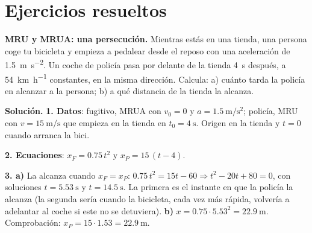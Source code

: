 
\section{Ejercicios resueltos}\label{sec:ud9-resueltos}

\begin{example}
    \textbf{MRU y MRUA: una persecución.} Mientras estás en una tienda, una persona coge tu bicicleta y empieza a pedalear desde el
    reposo con una aceleración de \qty{1.5}{\m\per\s\squared}. Un coche de policía pasa por delante de la tienda \qty{4}{\s} después,
    a \qty{54}{\km\per\hour} constantes, en la misma dirección. Calcula: a) cuánto tarda la policía en alcanzar a la persona;
    b) a qué distancia de la tienda la alcanza.

    \textbf{Solución.} \textbf{1. Datos}: fugitivo, MRUA con \(v_0 = 0\) y \(a = \qty{1.5}{\m\per\s\squared}\); policía, MRU con
    \(v = \qty{15}{\m\per\s}\) que empieza en la tienda en \(t_0 = \qty{4}{\s}\). Origen en la tienda y \(t = 0\) cuando arranca la bici.

    \textbf{2. Ecuaciones}: \(x_F = \num{0.75}\,t^2\) y \(x_P = 15\,(t - 4)\).

    \textbf{3. a)} La alcanza cuando \(x_F = x_P\): \(\num{0.75}\,t^2 = 15t - 60 \Rightarrow t^2 - 20t + 80 = 0\), con soluciones
    \(t = \qty{5.53}{\s}\) y \(t = \qty{14.5}{\s}\). La primera es el instante en que la policía la alcanza (la segunda sería
    cuando la bicicleta, cada vez más rápida, volvería a adelantar al coche si este no se detuviera).
    \textbf{b)} \(x = \num{0.75} \cdot \num{5.53}^2 = \qty{22.9}{\m}\). Comprobación: \(x_P = 15 \cdot \num{1.53} = \qty{22.9}{\m}\).
\end{example}


